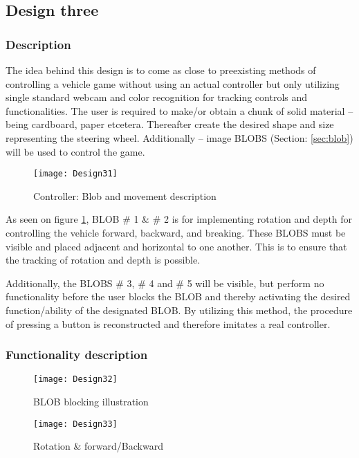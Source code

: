 \subsection{Design three}
\subsubsection*{Description}
The idea behind this design is to come as close to preexisting methods of controlling a vehicle game without using an actual controller but only utilizing single standard webcam and color recognition for tracking controls and functionalities. The user is required to make/or obtain a chunk of solid material – being cardboard, paper etcetera. Thereafter create the desired shape and size representing the steering wheel. Additionally – image BLOBS (Section: \ref{sec:blob}) will be used to control the game.

\begin{figure}[h]
\centering
\texttt{[image: Design31]}
\caption{Controller: Blob and movement description}
\label{fig:design31}
\end{figure}

As seen on figure \ref{fig:design31}, BLOB \# 1 \& \# 2 is for implementing rotation and depth for controlling the vehicle forward, backward, and breaking. These BLOBS must be visible and placed adjacent and horizontal to one another. This is to ensure that the tracking of rotation and depth is possible.

Additionally, the BLOBS \# 3, \# 4 and \# 5 will be visible, but perform no functionality before the user blocks the BLOB and thereby activating the desired function/ability of the designated BLOB. By utilizing this method, the procedure of pressing a button is reconstructed and therefore imitates a real controller.

\subsubsection*{Functionality description} \label{Dfunc}

\begin{figure}[h]
\centering
\caption{BLOB blocking illustration}
\label{fig:design32}
\texttt{[image: Design32]}
\end{figure}

\begin{figure}[h]
\centering
\texttt{[image: Design33]}
\caption{Rotation \& forward/Backward}
\label{fig:design33}
\end{figure}


